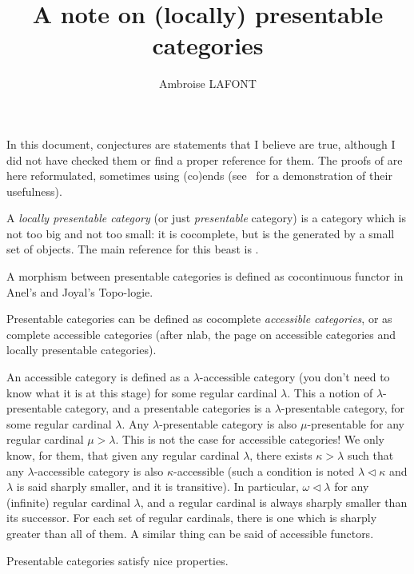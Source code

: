 \documentclass{article}
\title{A note on (locally) presentable categories}
\author{Ambroise LAFONT}
\begin{document}
\maketitle

\tableofcontents

In this document, conjectures are statements that I believe are true, although I did not
have checked them or find a proper reference for them.
The proofs of \cite{adamek_rosicky} are here reformulated, sometimes using (co)ends
(see~\cite{coend} for a demonstration of their usefulness).

A \emph{locally presentable category} (or just \emph{presentable} category) is a
category which is not too big and not too small: it is cocomplete, but is the
generated by a small set of objects.
The main reference for this beast is \cite{adamek_rosicky}.


A morphism between presentable categories is defined as cocontinuous functor in
Anel's and Joyal's Topo-logie.

Presentable categories can be defined as
cocomplete \emph{accessible categories}, or as complete accessible categories
(after nlab, the page on accessible categories and locally presentable categories).

An accessible category is defined as a $\lambda$-accessible category (you don't
need to know what it is at this stage) for some
regular cardinal $\lambda$. This a notion of $\lambda$-presentable category, and
a presentable categories is a $\lambda$-presentable category, for some regular
cardinal $\lambda$. Any $\lambda$-presentable category is also $\mu$-presentable
for any regular cardinal $\mu>\lambda$. This is not the case for accessible
categories! We only know, for them, that given any regular cardinal $\lambda$,
there exists $\kappa>\lambda$ such that any $\lambda$-accessible category is
also $\kappa$-accessible \cite[Theorem 2.11]{adamek_rosicky} (such a condition
is noted $\lambda \triangleleft \kappa$ and $\lambda$ is said sharply smaller,
and it is transitive).
In particular, $\omega\triangleleft \lambda$ for any (infinite) regular cardinal
$\lambda$, and a regular cardinal is always sharply smaller than its successor.
For each set of regular cardinals, there is one which is sharply greater than
all of them. A similar thing can be said of accessible functors.


Presentable categories satisfy nice properties.
\end{document}
